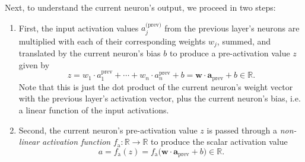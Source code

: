 \documentclass[11pt, a4paper]{article}
\renewcommand{\vec}[1]{\bm{#1}}
\newcommand{\w}{\vec{w}}
\renewcommand{\a}{\vec{a}}
\begin{document}
Next, to understand the current neuron's output, we proceed in two steps:
\begin{enumerate}

    \item First, the input activation values $ a_{j}^{\text{(prev)}} $ from the previous layer's neurons are multiplied with each of their corresponding weights $ w_{j} $, summed, and translated by the current neuron's bias $ b $ to produce a pre-activation value $ z $ given by
    \begin{equation}
        z = w_{1} \cdot a^{\text{prev}}_{1} + \cdots + w_{n} \cdot a^{\text{prev}}_{n} + b = \w \cdot \a_{\text{prev}} + b \in \mathbb{R}. \label{eq:preactivation}
    \end{equation}
    Note that this is just the dot product of the current neuron's weight vector with the previous layer's activation vector, plus the current neuron's bias, i.e. a linear function of the input activations.

    \item Second, the current neuron's pre-activation value $ z $ is passed through a \textit{non-linear} \textit{activation function} $ f_{\text{a}} : \mathbb{R} \to \mathbb{R} $ to produce the scalar activation value
    \begin{equation*}
        a = f_{\text{a}}(z) = f_{\text{a}}\big(\w \cdot \a_{\text{prev}} + b\big) \in \mathbb{R}.
    \end{equation*}

\end{enumerate}
\end{document}
